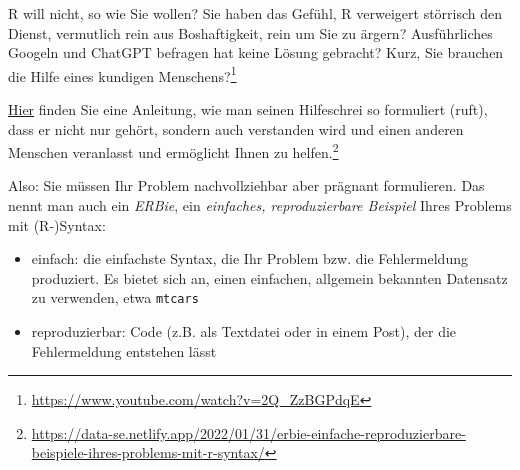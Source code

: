 \documentclass[
  a4paper,
  DIV=11]{scrreprt}
\providecommand{\tightlist}{%
  \setlength{\itemsep}{0pt}\setlength{\parskip}{0pt}}\usepackage{longtable,booktabs,array}
\theoremstyle{definition}
\theoremstyle{definition}
\theoremstyle{definition}
\theoremstyle{remark}
\begin{document}
R will nicht, so wie Sie wollen? Sie haben das Gefühl, R verweigert
störrisch den Dienst, vermutlich rein aus Boshaftigkeit, rein um Sie zu
ärgern? Ausführliches Googeln und ChatGPT befragen hat keine Lösung
gebracht? Kurz, Sie brauchen die Hilfe eines kundigen
Menschens?\footnote{\url{https://www.youtube.com/watch?v=2Q_ZzBGPdqE}}

\href{https://data-se.netlify.app/2022/01/31/erbie-einfache-reproduzierbare-beispiele-ihres-problems-mit-r-syntax/}{Hier}
finden Sie eine Anleitung, wie man seinen Hilfeschrei so formuliert
(ruft), dass er nicht nur gehört, sondern auch verstanden wird und einen
anderen Menschen veranlasst und ermöglicht Ihnen zu helfen.\footnote{\url{https://data-se.netlify.app/2022/01/31/erbie-einfache-reproduzierbare-beispiele-ihres-problems-mit-r-syntax/}}

Also: Sie müssen Ihr Problem nachvollziehbar aber prägnant formulieren.
Das nennt man auch ein \emph{ERBie}, ein \emph{einfaches,
reproduzierbare Beispiel} Ihres Problems mit (R-)Syntax:

\begin{itemize}
\tightlist
\item
  einfach: die einfachste Syntax, die Ihr Problem bzw. die Fehlermeldung
  produziert. Es bietet sich an, einen einfachen, allgemein bekannten
  Datensatz zu verwenden, etwa \texttt{mtcars}
\item
  reproduzierbar: Code (z.B. als Textdatei oder in einem Post), der die
  Fehlermeldung entstehen lässt
\end{itemize}
\end{document}
